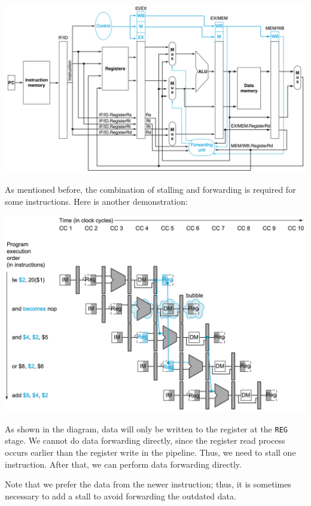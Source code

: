 \begin{center}
  \includegraphics[width=\textwidth]{Figure/pipeline_datapath.png}
\end{center}

As mentioned before, the combination of stalling and forwarding is required for some instructions. Here is another demonstration:

\begin{center}
  \includegraphics[width=\textwidth]{Figure/pipeline_stall_forw_2.png}
\end{center}

As shown in the diagram, data will only be written to the register at the \verb|REG| stage. We cannot do data forwarding directly, since the register read process occurs earlier than the register write in the pipeline. Thus, we need to stall one instruction. After that, we can perform data forwarding directly. 

Note that we prefer the data from the newer instruction; thus, it is sometimes necessary to add a stall to avoid forwarding the outdated data.

